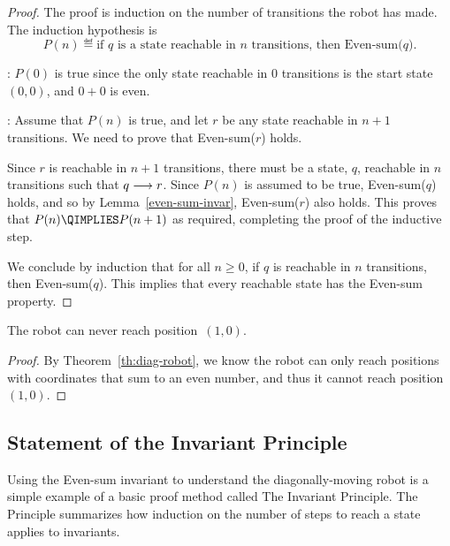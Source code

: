 \begin{proof}
The proof is induction on the number of transitions the robot has
made.  The induction hypothesis is
\[
P(n) \eqdef \text{if $q$ is a state reachable in $n$ transitions, then
  Even-sum($q$)}.
\]

: $P(0)$ is true since the only state reachable in 0
transitions is the start state $(0, 0)$, and $0 + 0$ is even.

: Assume that $P(n)$ is true, and let $r$ be any
state reachable in $n+1$ transitions. We need to prove that
Even-sum($r$) holds.

Since $r$ is reachable in $n+1$ transitions, there must be a state,
$q$, reachable in $n$ transitions such that $q \mathrel{\longrightarrow} r$.  Since
$P(n)$ is assumed to be true, Even-sum($q$) holds, and so by
Lemma~\ref{even-sum-invar}, Even-sum($r$) also holds.  This proves
that $P(n) \QIMPLIES P(n + 1)$ as required, completing the proof of
the inductive step.

We conclude by induction that for all $n \ge 0$, if $q$ is reachable
in $n$ transitions, then Even-sum($q$).  This implies that every
reachable state has the Even-sum property.

\end{proof}

\begin{corollary}\label{cor:diag-robot}
The robot can never reach position~$(1, 0)$.
\end{corollary}

\begin{proof}
By Theorem~\ref{th:diag-robot}, we know the robot can only reach
positions with coordinates that sum to an even number, and thus it
cannot reach position~$(1, 0)$.
\end{proof}

\iffalse
Since this was the first time we proved that a predicate was an
invariant, we were careful to go through all four cases in gory
detail.  As you become more experienced with such proofs, you will
likely become more brief as well.  Indeed, if we were going through
the proof again at a later point in the text, we might simply note
that the sum of the coordinates after step~$t + 1$ can be only $x +
y$, $x + y + 2$ or $x + y - 2$ and therefore that the sum is even.
\fi

\subsection{Statement of the Invariant Principle}\label{subsec:invariant}
Using the Even-sum invariant to understand the diagonally-moving robot
is a simple example of a basic proof method called The Invariant
Principle.  The Principle summarizes how induction on the number of
steps to reach a state applies to invariants.   

